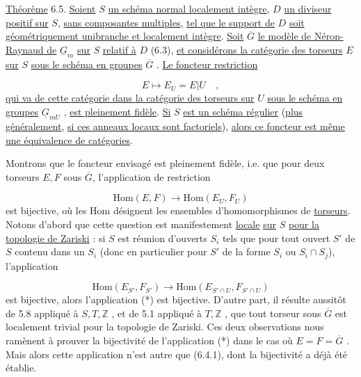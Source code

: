 \underline{Théorème} 6.5. \underline{Soient} $S$ \underline{un schéma normal localement intègre}, $D$ \underline{un diviseur positif sur} $S$, \underline{sans composantes multiples}, \underline{tel que le support de} $D$ \underline{soit géométriquement unibranche et localement intègre}. \underline{Soit} $\overline{G}$ \underline{le modèle de Néron-Raynaud de} $\underline{G}_m$ \underline{sur} $S$ \underline{relatif à} $D$ (6.3), \underline{et considérons la catégorie des torseurs} $E$ \underline{sur} $S$ \underline{sous le schéma en groupes} $\overline{G}$ . \underline{Le foncteur restriction}

\begin{equation*}
E \longmapsto E_U = E|U \quad ,
\end{equation*}
\underline{qui va de cette catégorie dans la catégorie des torseurs sur} $U$ \underline{sous le schéma en groupes} $\underline{G}_{mU}$ , \underline{est pleinement fidèle}. \underline{Si} $S$ \underline{est un schéma régulier} (\underline{plus généralement}, \underline{si ces anneaux locaux sont factoriels}), \underline{alors ce foncteur est même une équivalence de catégories}.



Montrons que le foncteur envisagé est pleinement fidèle, i.e. que pour deux torseurs $E,F$ sous $\overline{G}$, l'application de restriction

\begin{equation}\tag{*}
\mathrm{Hom}(E,F) \longrightarrow \mathrm{Hom}(E_U,F_U)
\end{equation}
est bijective, où les Hom désignent les ensembles d'homomorphismes de \underline{torseurs}. Notons d'abord que cette question est manifestement \underline{locale} \underline{sur} $S$ \underline{pour la topologie de Zariski} : si $S$ est réunion d'ouverts $S_i$ tels que pour tout ouvert $S'$ de $S$ contenu dans un $S_i$ (donc en particulier pour $S'$ de la forme $S_i$ ou $S_i \cap S_j$), l'application

\begin{equation*}
\mathrm{Hom}(E_{S'},F_{S'}) \longrightarrow \mathrm{Hom}(E_{S' \cap U},F_{S' \cap U})
\end{equation*}
est bijective, alors l'application (*) est bijective. D'autre part, il résulte aussitôt de 5.8 appliqué à $S,T,\mathbb{Z}$ , et de 5.1 appliqué à $T,\mathbb{Z}$ , que tout torseur sous $\overline{G}$ est localement trivial pour la topologie de Zariski. Ces deux observations nous ramènent à prouver la bijectivité de l'application (*) dans le cas où $E=F=\overline{G}$ . Mais alors cette application n'est autre que (6.4.1), dont la bijectivité a déjà été établie.


